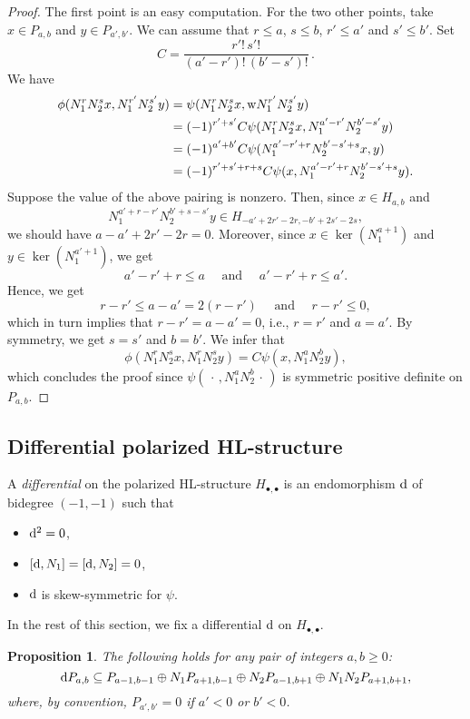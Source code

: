 \documentclass[11pt]{amsart}
\newtheorem{prop}[thm]{Proposition}
\theoremstyle{definition}
\numberwithin{equation}{section}
\newcommand{\ie}{i.e.}
\renewcommand{\~}{\widetilde}
\newcommand{\myand}{\text{ and }}
\newcommand{\bul}{\bullet} %
\newcommand{\ccdot}{\,\cdot\,}
\renewcommand{\d}{{\rm d}} %
\newcommand{\w}{{\rm w}} %
\begin{document}
\begin{proof}
The first point is an easy computation. For the two other points, take $x\in P_{a,b}$ and $y\in P_{a',b'}$. We can assume that $r\leq a$, $s\leq b$, $r'\leq a'$ and $s'\leq b'$. Set \[ C=\frac{r'!\,s'!}{(a'-r')!\,(b'-s')!}\,. \]
We have
\begin{align*}
\phi(N_1^rN_2^sx, N_1^{r'}N_2^{s'}y)
  &= \psi(N_1^rN_2^sx, \w N_1^{r'}N_2^{s'}y) \\
  &= (-1)^{r'+s'}C\psi(N_1^rN_2^sx, N_1^{a'-r'}N_2^{b'-s'}y) \\
  &= (-1)^{a'+b'}C\psi(N_1^{a'-r'+r}N_2^{b'-s'+s}x, y) \\
  &= (-1)^{r'+s'+r+s}C\psi(x, N_1^{a'-r'+r}N_2^{b'-s'+s}y).
\end{align*}
Suppose the value of the above pairing is nonzero. Then, since $x\in H_{a,b}$ and
\[ N_1^{a'+r-r'}N_2^{b'+s-s'}y\in H_{-a'+2r'-2r,-b'+2s'-2s}, \]
we should have $a-a'+2r'-2r=0$. Moreover, since $x\in\ker(N_1^{a+1})$ and $y\in\ker(N_1^{a'+1})$, we get
\[ a'-r'+r\leq a \quad\myand\quad a'-r'+r\leq a'. \]
Hence, we get
\[ r-r'\leq a-a'=2(r-r') \quad\myand\quad r-r'\leq 0,\]
which in turn implies that $r-r'=a-a'=0$, \ie, $r=r'$ and $a=a'$. By symmetry, we get $s=s'$ and $b=b'$. We infer that
\[ \phi(N_1^rN_2^sx, N_1^rN_2^sy) = C\psi(x, N_1^aN_2^by), \]
which concludes the proof since $\psi(\ccdot,N_1^aN_2^b\ccdot)$ is symmetric positive definite on $P_{a,b}$.
\end{proof}



\subsection{Differential polarized HL-structure}

A \emph{differential} on the polarized HL-structure $H_{\bul,\bul}$ is an endomorphism $\d$ of bidegree $(-1,-1)$ such that
\begin{itemize}
\item $\d^2=0$,
\item $[\d,N_1]=[\d,N_2]=0$,
\item $\d$ is skew-symmetric for $\psi$.
\end{itemize}

In the rest of this section, we fix a differential $\d$ on $H_{\bul,\bul}$.

\begin{prop}
The following holds for any pair of integers $a,b\geq0$:
\[ \d P_{a,b} \subseteq P_{a-1,b-1} \oplus N_1 P_{a+1,b-1} \oplus N_2 P_{a-1,b+1} \oplus N_1N_2 P_{a+1,b+1}, \]
where, by convention, $P_{a',b'}=0$ if $a'<0$ or $b'<0$.
\end{prop}
\end{document}
